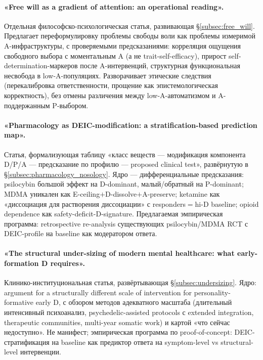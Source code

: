 \paragraph{«Free will as a gradient of attention: an operational reading».} Отдельная философско-психологическая статья, развивающая §\ref{subsec:free_will}. Предлагает переформулировку проблемы свободы воли как проблемы измеримой A-инфраструктуры, с проверяемыми предсказаниями: корреляция ощущения свободного выбора с моментальным A (а не trait-self-efficacy), прирост self-determination-маркеров после A-интервенций, структурная функциональная несвобода в low-A-популяциях. Разворачивает этические следствия (перекалибровка ответственности, прощение как эпистемологическая корректность), без отмены различения между low-A-автоматизмом и A-поддержанным P-выбором.

\paragraph{«Pharmacology as DEIC-modification: a stratification-based prediction map».} Статья, формализующая таблицу «класс веществ --- модификация компонента D/P/A --- предсказание по профилю --- proposed clinical test», развёрнутую в §\ref{subsec:pharmacology_nosology}. Ядро --- дифференциальные предсказания: psilocybin большой эффект на D-dominant, малый/обратный на P-dominant; MDMA уникален как E-ceiling$+$D-dissolve$+$A-preserve; ketamine как «диссоциация для растворения диссоциации» с responders$=$hi-D baseline; opioid dependence как safety-deficit-D-signature. Предлагаемая эмпирическая программа: retrospective re-analysis существующих psilocybin/MDMA RCT с DEIC-profile на baseline как модератором ответа.

\paragraph{«The structural under-sizing of modern mental healthcare: what early-formation D requires».} Клинико-институциональная статья, развёртывающая §\ref{subsec:undersizing}. Ядро: argument for a structurally different scale of intervention for personality-formative early D, с обзором методов адекватного масштаба (длительный интенсивный психоанализ, psychedelic-assisted protocols с extended integration, therapeutic communities, multi-year somatic work) и картой «что сейчас недоступно». Не манифест; эмпирическая программа по proof-of-concept: DEIC-стратификация на baseline как предиктор ответа на symptom-level vs structural-level интервенции.

